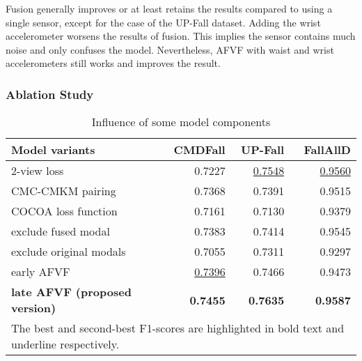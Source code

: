 \documentclass[conference]{IEEEtran}
\begin{document}
Fusion generally improves or at least retains the results compared to using a single sensor, except for the case of the UP-Fall dataset. Adding the wrist accelerometer worsens the results of fusion. This implies the sensor contains much noise and only confuses the model. Nevertheless, AFVF with waist and wrist accelerometers still works and improves the result.

\subsubsection{Ablation Study}
\label{subsec: ablation}

\begin{table}
\caption{Influence of some model components}
\label{tab: ablation}
\centering
\begin{tabular}{@{}lrrr@{}}
\toprule
\textbf{Model variants} & \textbf{CMDFall} & \textbf{UP-Fall} & \textbf{FallAllD} \\ \midrule
2-view loss & 0.7227 & \underline{0.7548} & \underline{0.9560} \\
CMC-CMKM pairing & 0.7368 & 0.7391 & 0.9515 \\
COCOA loss function & 0.7161 & 0.7130 & 0.9379 \\
exclude fused modal & 0.7383 & 0.7414 & 0.9545 \\
exclude original modals & 0.7055 & 0.7311 & 0.9297 \\
early AFVF & \underline{0.7396} & 0.7466 & 0.9473 \\
\textbf{late AFVF (proposed version)} & \textbf{0.7455} & \textbf{0.7635} & \textbf{0.9587} \\ \bottomrule
\multicolumn{4}{p{210pt}}{The best and second-best F1-scores are highlighted in bold text and underline respectively.}
\end{tabular}
\end{table}
\end{document}
